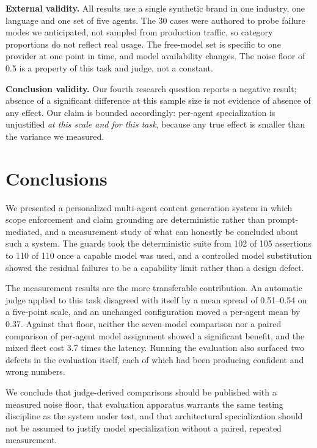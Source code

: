 \documentclass[9pt,twocolumn]{extarticle}
\begin{document}
\textbf{External validity.} All results use a single synthetic brand in one
industry, one language and one set of five agents. The 30 cases were authored
to probe failure modes we anticipated, not sampled from production traffic, so
category proportions do not reflect real usage. The free-model set is specific
to one provider at one point in time, and model availability changes. The noise
floor of 0.5 is a property of this task and judge, not a constant.

\textbf{Conclusion validity.} Our fourth research question reports a negative
result; absence of a significant difference at this sample size is not evidence
of absence of any effect. Our claim is bounded accordingly: per-agent
specialization is unjustified \textit{at this scale and for this task}, because
any true effect is smaller than the variance we measured.

\section{Conclusions}

We presented a personalized multi-agent content generation system in which
scope enforcement and claim grounding are deterministic rather than
prompt-mediated, and a measurement study of what can honestly be concluded
about such a system. The guards took the deterministic suite from 102 of 105
assertions to 110 of 110 once a capable model was used, and a controlled model
substitution showed the residual failures to be a capability limit rather than
a design defect.

The measurement results are the more transferable contribution. An automatic
judge applied to this task disagreed with itself by a mean spread of 0.51--0.54
on a five-point scale, and an unchanged configuration moved a per-agent mean by
0.37. Against that floor, neither the seven-model comparison nor a paired
comparison of per-agent model assignment showed a significant benefit, and the
mixed fleet cost 3.7 times the latency. Running the evaluation also surfaced
two defects in the evaluation itself, each of which had been producing
confident and wrong numbers.

We conclude that judge-derived comparisons should be published with a measured
noise floor, that evaluation apparatus warrants the same testing discipline as
the system under test, and that architectural specialization should not be
assumed to justify model specialization without a paired, repeated measurement.
\end{document}
